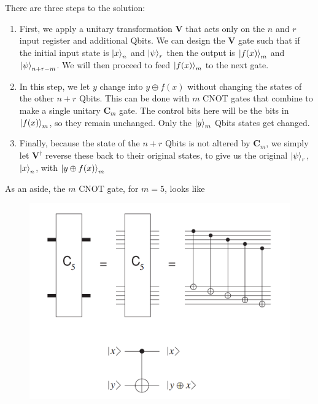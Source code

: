 \documentclass{book}
\theoremstyle{definition}
\begin{document}
There are three steps to the solution:
\begin{enumerate}
	\item First, we apply a unitary transformation $\mathbf{V}$ that acts only on the $n$ and $r$ input register and additional Qbits. We can design the $\mathbf{V}$ gate such that if the initial input state is $\ket{x}_n$ and $\ket{\psi}_r$ then the output is $\ket{f(x)}_m$ and $\ket{\psi}_{n+r-m}$. We will then proceed to feed $\ket{f(x)}_m$ to the next gate.
	\item In this step, we let $y$ change into $y\oplus f(x)$ without changing the states of the other $n+r$ Qbits. This can be done with $m$ CNOT gates that combine to make a single unitary $\mathbf{C}_m$ gate. The control bits here will be the bits in $\ket{f(x)}_m$, so they remain unchanged. Only the $\ket{y}_m$ Qbits states get changed. 
	\item Finally, because the state of the $n+r$ Qbits is not altered by $\mathbf{C}_m$, we simply let $\mathbf{V}^\dagger$ reverse these back to their original states, to give us the original $\ket{\psi}_r$, $\ket{x}_n$, with $\ket{y\oplus f(x)}_m$ 
\end{enumerate}


As an aside, the $m$ CNOT gate, for $m=5$, looks like
\begin{figure}[!htb]
	\centering
	\includegraphics[scale=0.6]{mcnot}
\end{figure}
\end{document}
